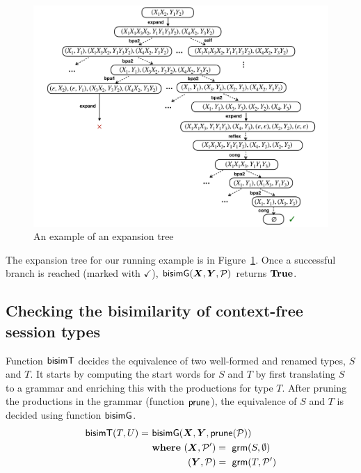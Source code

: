 
\begin{figure}[t]
  \centering
  \includegraphics[width=12cm]{img/expansion_tree_example}  
  \caption{An example of an expansion tree}
  \label{fig:expansion-tree}
\end{figure}

\begin{example}
  The expansion tree for our running example is in
  Figure~\ref{fig:expansion-tree}. Once a successful branch is reached
  (marked with $\checkmark$),
  $\Bisim(\vec X, \vec Y, \productions)$ returns $\mathbf{True}$.
\end{example}

\subsection{Checking the bisimilarity of context-free session types}

Function $\mathsf{bisimT}$ decides the equivalence of two well-formed and
renamed types, $S$ and $T$.  It starts by computing the start words
for $S$ and $T$ by first translating $S$ to a grammar and enriching
this with the productions for type $T$. After pruning the productions
in the grammar (function $\mathsf{prune}$), the equivalence of $S$ and
$T$ is decided using function $\mathsf{bisimG}$.
%
\begin{align*}
  \BisimT(T, U) =\ & \Bisim(\vec X, \vec Y, \Prune (\productions))
  \\
  &\Where\ (\vec X, \productions') =\ \grm (S, \emptyset)
  \\
  &\qquad\quad\;\;\, (\vec Y, \productions) =\ \grm (T, \productions')
\end{align*}

